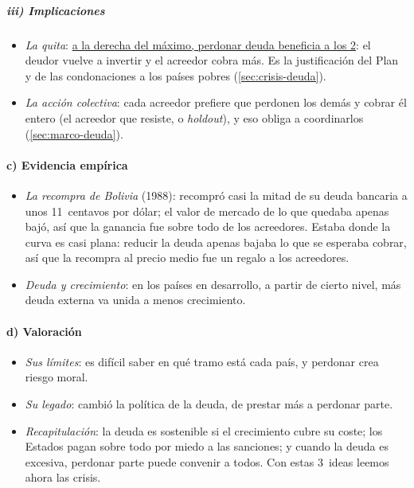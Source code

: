 \documentclass[11pt]{article}
\begin{document}
\subparagraph{iii) Implicaciones}

\begin{itemize}
\item \emph{La quita}: \uline{a la derecha del máximo, perdonar deuda beneficia a los 2}: el deudor vuelve a invertir y el acreedor cobra más. Es la justificación del Plan  y de las condonaciones a los países pobres (\ref{sec:crisis-deuda}).
\item \emph{La acción colectiva}: cada acreedor prefiere que perdonen los demás y cobrar él entero (el acreedor que resiste, o \emph{holdout}), y eso obliga a coordinarlos (\ref{sec:marco-deuda}).
\end{itemize}

\paragraph{c) Evidencia empírica}

\begin{itemize}
\item \emph{La recompra de Bolivia} (1988): recompró casi la mitad de su deuda bancaria a unos 11~centavos por dólar; el valor de mercado de lo que quedaba apenas bajó, así que la ganancia fue sobre todo de los acreedores. Estaba donde la curva es casi plana: reducir la deuda apenas bajaba lo que se esperaba cobrar, así que la recompra al precio medio fue un regalo a los acreedores\nocite{BulowRogoff1988Buyback}.
\item \emph{Deuda y crecimiento}: en los países en desarrollo, a partir de cierto nivel, más deuda externa va unida a menos crecimiento\nocite{PattilloPoirsonRicci2002}.
\end{itemize}

\paragraph{d) Valoración}

\begin{itemize}
\item \emph{Sus límites}: es difícil saber en qué tramo está cada país, y perdonar crea riesgo moral.
\item \emph{Su legado}: cambió la política de la deuda, de prestar más a perdonar parte.
\end{itemize}

\begin{itemize}
\item \emph{Recapitulación}: la deuda es sostenible si el crecimiento cubre su coste; los Estados pagan sobre todo por miedo a las sanciones; y cuando la deuda es excesiva, perdonar parte puede convenir a todos. Con estas 3~ideas leemos ahora las crisis.
\end{itemize}
\end{document}
